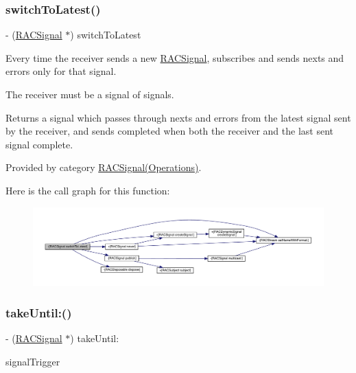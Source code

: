 \subsubsection{\texorpdfstring{switch\+To\+Latest()}{switchToLatest()}\hspace{0.1cm}{\footnotesize\ttfamily [3/3]}}
{\footnotesize\ttfamily -\/ (\mbox{\hyperlink{interface_r_a_c_signal}{R\+A\+C\+Signal}} $\ast$) switch\+To\+Latest \begin{DoxyParamCaption}{ }\end{DoxyParamCaption}}

Every time the receiver sends a new \mbox{\hyperlink{interface_r_a_c_signal}{R\+A\+C\+Signal}}, subscribes and sends {\ttfamily next}s and {\ttfamily error}s only for that signal.

The receiver must be a signal of signals.

Returns a signal which passes through {\ttfamily next}s and {\ttfamily error}s from the latest signal sent by the receiver, and sends {\ttfamily completed} when both the receiver and the last sent signal complete. 

Provided by category \mbox{\hyperlink{category_r_a_c_signal_07_operations_08_a0a6780c4580e1a5338a9a891f7c69ea1}{R\+A\+C\+Signal(\+Operations)}}.

Here is the call graph for this function\+:\nopagebreak
\begin{figure}[H]
\begin{center}
\leavevmode
\includegraphics[width=350pt]{interface_r_a_c_signal_a0a6780c4580e1a5338a9a891f7c69ea1_cgraph}
\end{center}
\end{figure}
\mbox{\label{interface_r_a_c_signal_afb214e9e69dc34880b306c118b8e56d4}} 
\subsubsection{\texorpdfstring{take\+Until\+:()}{takeUntil:()}\hspace{0.1cm}{\footnotesize\ttfamily [1/3]}}
{\footnotesize\ttfamily -\/ (\mbox{\hyperlink{interface_r_a_c_signal}{R\+A\+C\+Signal}} $\ast$) take\+Until\+: \begin{DoxyParamCaption}\item[{(\mbox{\hyperlink{interface_r_a_c_signal}{R\+A\+C\+Signal}} $\ast$)}]{signal\+Trigger }\end{DoxyParamCaption}}

